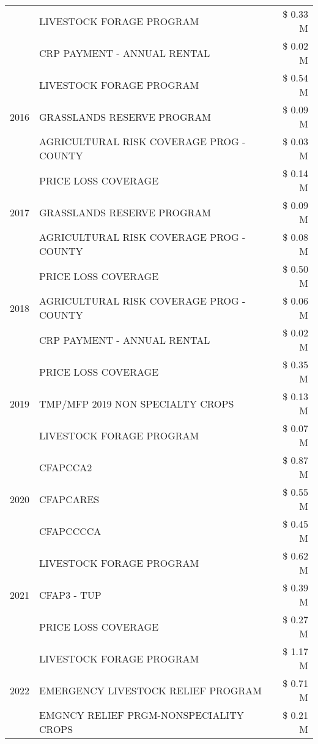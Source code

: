 \begin{tabular}{llr}
 & LIVESTOCK FORAGE PROGRAM & \$ 0.33 M \\
 & CRP PAYMENT - ANNUAL RENTAL & \$ 0.02 M \\
\cline{1-3}
\multirow[t]{3}{*}{2016} & LIVESTOCK FORAGE PROGRAM & \$ 0.54 M \\
 & GRASSLANDS RESERVE PROGRAM & \$ 0.09 M \\
 & AGRICULTURAL RISK COVERAGE PROG - COUNTY & \$ 0.03 M \\
\cline{1-3}
\multirow[t]{3}{*}{2017} & PRICE LOSS COVERAGE & \$ 0.14 M \\
 & GRASSLANDS RESERVE PROGRAM & \$ 0.09 M \\
 & AGRICULTURAL RISK COVERAGE PROG - COUNTY & \$ 0.08 M \\
\cline{1-3}
\multirow[t]{3}{*}{2018} & PRICE LOSS COVERAGE & \$ 0.50 M \\
 & AGRICULTURAL RISK COVERAGE PROG - COUNTY & \$ 0.06 M \\
 & CRP PAYMENT - ANNUAL RENTAL & \$ 0.02 M \\
\cline{1-3}
\multirow[t]{3}{*}{2019} & PRICE LOSS COVERAGE & \$ 0.35 M \\
 & TMP/MFP 2019 NON SPECIALTY CROPS & \$ 0.13 M \\
 & LIVESTOCK FORAGE PROGRAM & \$ 0.07 M \\
\cline{1-3}
\multirow[t]{3}{*}{2020} & CFAPCCA2 & \$ 0.87 M \\
 & CFAPCARES & \$ 0.55 M \\
 & CFAPCCCCA & \$ 0.45 M \\
\cline{1-3}
\multirow[t]{3}{*}{2021} & LIVESTOCK FORAGE PROGRAM & \$ 0.62 M \\
 & CFAP3 - TUP & \$ 0.39 M \\
 & PRICE LOSS COVERAGE & \$ 0.27 M \\
\cline{1-3}
\multirow[t]{3}{*}{2022} & LIVESTOCK FORAGE PROGRAM & \$ 1.17 M \\
 & EMERGENCY LIVESTOCK RELIEF PROGRAM & \$ 0.71 M \\
 & EMGNCY RELIEF PRGM-NONSPECIALITY CROPS & \$ 0.21 M \\
\cline{1-3}
\bottomrule
\end{tabular}

